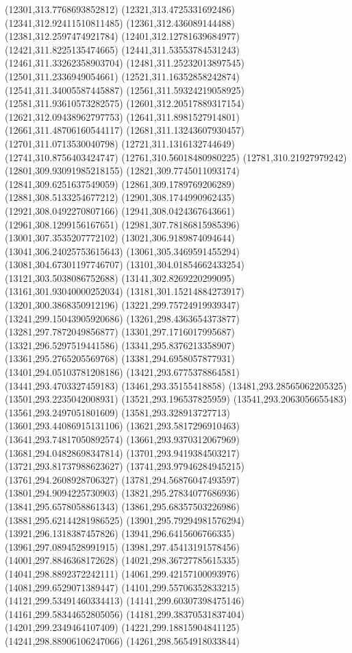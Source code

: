 {(12301,313.7768693852812)
(12321,313.4725331692486)
(12341,312.92411510811485)
(12361,312.436089144488)
(12381,312.2597474921784)
(12401,312.12781639684977)
(12421,311.8225135474665)
(12441,311.53553784531243)
(12461,311.33262358903704)
(12481,311.25232013897545)
(12501,311.2336949054661)
(12521,311.16352858242874)
(12541,311.34005587445887)
(12561,311.59324219058925)
(12581,311.93610573282575)
(12601,312.20517889317154)
(12621,312.09438962797753)
(12641,311.8981527914801)
(12661,311.48706160544117)
(12681,311.13243607930457)
(12701,311.0713530040798)
(12721,311.1316132744649)
(12741,310.8756403424747)
(12761,310.56018480980225)
(12781,310.21927979242)
(12801,309.93091985218155)
(12821,309.7745011093174)
(12841,309.6251637549059)
(12861,309.1789769206289)
(12881,308.5133254677212)
(12901,308.1744990962435)
(12921,308.0492270807166)
(12941,308.0424367643661)
(12961,308.1299156167651)
(12981,307.78186815985396)
(13001,307.3535207772102)
(13021,306.9189874094644)
(13041,306.24025753615643)
(13061,305.3469591455294)
(13081,304.67301197746707)
(13101,304.01854662433254)
(13121,303.5038086752688)
(13141,302.8269220299095)
(13161,301.93040000252034)
(13181,301.15214884273917)
(13201,300.3868350912196)
(13221,299.75724919939347)
(13241,299.15043905920686)
(13261,298.4363654373877)
(13281,297.7872049856877)
(13301,297.1716017995687)
(13321,296.5297519441586)
(13341,295.8376213358907)
(13361,295.2765205569768)
(13381,294.6958057877931)
(13401,294.05103781208186)
(13421,293.6775378864581)
(13441,293.4703327459183)
(13461,293.35155418858)
(13481,293.28565062205325)
(13501,293.2235042008931)
(13521,293.196537825959)
(13541,293.2063056655483)
(13561,293.2497051801609)
(13581,293.328913727713)
(13601,293.44086915131106)
(13621,293.5817296910463)
(13641,293.74817050892574)
(13661,293.9370312067969)
(13681,294.04828698347814)
(13701,293.9419384503217)
(13721,293.81737988623627)
(13741,293.97946284945215)
(13761,294.2608928706327)
(13781,294.56876047493597)
(13801,294.9094225730903)
(13821,295.27834077686936)
(13841,295.6578058861343)
(13861,295.68357503226986)
(13881,295.62144281986525)
(13901,295.79294981576294)
(13921,296.1318387457826)
(13941,296.6415606766335)
(13961,297.0894528991915)
(13981,297.45413191578456)
(14001,297.8846368172628)
(14021,298.36727785615335)
(14041,298.8892372242111)
(14061,299.42157100093976)
(14081,299.6529071389447)
(14101,299.55706352833215)
(14121,299.53491460334413)
(14141,299.60307398475146)
(14161,299.58344652805056)
(14181,299.38370531837404)
(14201,299.2349464107409)
(14221,299.18815904841125)
(14241,298.88906106247066)
(14261,298.5654918033844)
}
